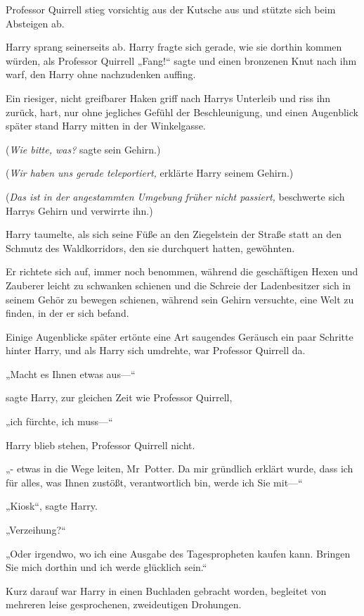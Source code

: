 {Professor Quirrell stieg vorsichtig aus der Kutsche aus und stützte sich beim Absteigen ab.

Harry sprang seinerseits ab. Harry fragte sich gerade, wie sie dorthin kommen würden, als Professor Quirrell „Fang!“ sagte und einen bronzenen Knut nach ihm warf, den Harry ohne nachzudenken auffing.

Ein riesiger, nicht greifbarer Haken griff nach Harrys Unterleib und riss ihn zurück, hart, nur ohne jegliches Gefühl der Beschleunigung, und einen Augenblick später stand Harry mitten in der Winkelgasse.

(\emph{Wie bitte, was?} sagte sein Gehirn.)

(\emph{Wir haben uns gerade teleportiert,} erklärte Harry seinem Gehirn.)

(\emph{Das ist in der angestammten Umgebung früher nicht passiert,} beschwerte sich Harrys Gehirn und verwirrte ihn.)

Harry taumelte, als sich seine Füße an den Ziegelstein der Straße statt an den Schmutz des Waldkorridors, den sie durchquert hatten, gewöhnten.

Er richtete sich auf, immer noch benommen, während die geschäftigen Hexen und Zauberer leicht zu schwanken schienen und die Schreie der Ladenbesitzer sich in seinem Gehör zu bewegen schienen, während sein Gehirn versuchte, eine Welt zu finden, in der er sich befand.

Einige Augenblicke später ertönte eine Art saugendes Geräusch ein paar Schritte hinter Harry, und als Harry sich umdrehte, war Professor Quirrell da.

„Macht es Ihnen etwas aus—“

sagte Harry, zur gleichen Zeit wie Professor Quirrell,

„ich fürchte, ich muss—“

Harry blieb stehen, Professor Quirrell nicht.

„- etwas in die Wege leiten, Mr~Potter. Da mir gründlich erklärt wurde, dass ich für alles, was Ihnen zustößt, verantwortlich bin, werde ich Sie mit—“

„Kiosk“, sagte Harry.

„Verzeihung?“

„Oder irgendwo, wo ich eine Ausgabe des Tagespropheten kaufen kann. Bringen Sie mich dorthin und ich werde glücklich sein.“

Kurz darauf war Harry in einen Buchladen gebracht worden, begleitet von mehreren leise gesprochenen, zweideutigen Drohungen.

}
